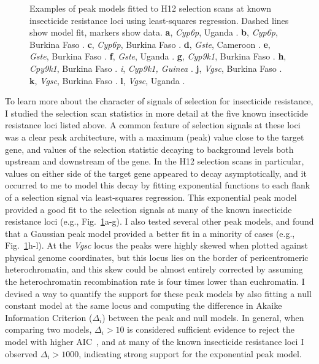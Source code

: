 \begin{refsection}
\begin{figure}[t!]
\begin{subfigure}[t]{0.32\textwidth}
    \end{subfigure}
    \caption{Examples of peak models fitted to H12 selection scans at known insecticide resistance loci using least-squares regression. Dashed lines show model fit, markers show data. \textbf{a}, \textit{Cyp6p}, Uganda \agam. \textbf{b}, \textit{Cyp6p}, Burkina Faso \agam. \textbf{c}, \textit{Cyp6p}, Burkina Faso \acol. \textbf{d}, \textit{Gste}, Cameroon \agam. \textbf{e}, \textit{Gste}, Burkina Faso \agam. \textbf{f}, \textit{Gste}, Uganda \agam. \textbf{g}, \textit{Cyp9k1}, Burkina Faso \agam. \textbf{h}, \textit{Cpy9k1}, Burkina Faso \acol. \textit{i}, \textit{Cyp9k1, Guinea \agam}. \textbf{j}, \textit{Vgsc}, Burkina Faso \acol. \textbf{k}, \textit{Vgsc}, Burkina Faso \agam. \textbf{l}, \textit{Vgsc}, Uganda \agam.}
    \label{fig:peak_fits}
\end{figure}


To learn more about the character of signals of selection for insecticide resistance, I studied the selection scan statistics in more detail at the five known insecticide resistance loci listed above.
%
A common feature of selection signals at these loci was a clear peak architecture, with a maximum (peak) value close to the target gene, and values of the selection statistic decaying to background levels both upstream and downstream of the gene.
%
In the H12 selection scans in particular, values on either side of the target gene appeared to decay asymptotically, and it occurred to me to model this decay by fitting exponential functions to each flank of a selection signal via least-squares regression.
%
This exponential peak model provided a good fit to the selection signals at many of the known insecticide resistance loci (e.g., Fig.~\ref{fig:peak_fits}a-g).
%
I also tested several other peak models, and found that a Gaussian peak model provided a better fit in a minority of cases (e.g., Fig.~\ref{fig:peak_fits}h-l).
%
At the \textit{Vgsc} locus the peaks were highly skewed when plotted against physical genome coordinates, but this locus lies on the border of pericentromeric heterochromatin, and this skew could be almost entirely corrected by assuming the heterochromatin recombination rate is four times lower than euchromatin.
%
I devised a way to quantify the support for these peak models by also fitting a null constant model at the same locus and computing the difference in Akaike Information Criterion ($\Delta_i$) between the peak and null models.
%
In general, when comparing two models, $\Delta_i > 10$ is considered sufficient evidence to reject the model with higher AIC~\parencite{Burnham2002}, and at many of the known insecticide resistance loci I observed $\Delta_i > 1000$, indicating strong support for the exponential peak model.
%



\end{refsection}

